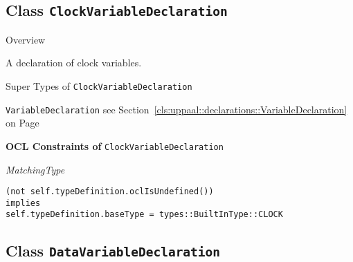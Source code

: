 \subsection{Class \bfseries \texttt{ClockVariableDeclaration}\normalfont}
\label{cls:uppaal::declarations::ClockVariableDeclaration} 
	
	\begin{longdescription}
		\item[Overview] 		
				

	

		A declaration of clock variables.		
		\item[Super Types of \texttt{ClockVariableDeclaration}] ~
			\begin{longdescription}
				\item[\texttt{VariableDeclaration}] see Section~\ref{cls:uppaal::declarations::VariableDeclaration} on Page~\pageref{cls:uppaal::declarations::VariableDeclaration}						\end{longdescription}
		
	
			\item[\textbf{OCL Constraints of} \texttt{ClockVariableDeclaration}] ~
			\begin{longdescription}
	\item[\small\textit{MatchingType}] ~ 
	\nopagebreak
	
		\begin{lstlisting}[breaklines=true]
(not self.typeDefinition.oclIsUndefined())
implies
self.typeDefinition.baseType = types::BuiltInType::CLOCK		\end{lstlisting}
			\end{longdescription}
	
	\end{longdescription}
	

\subsection{Class \bfseries \texttt{DataVariableDeclaration}\normalfont}
\label{cls:uppaal::declarations::DataVariableDeclaration} 
	
